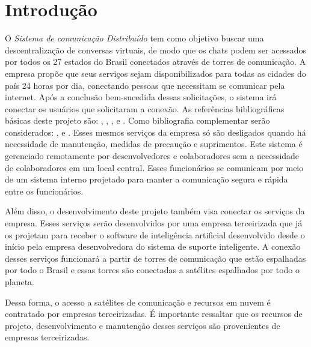 

\chapter{ Introdu\c{c}\~{a}o}

O \textit{Sistema de comunicação Distribuído} tem como objetivo buscar uma descentralização de conversas virtuais, de modo que os chats podem ser acessados por todos os 27 estados do Brasil conectados através de torres de comunicação.
A empresa propõe que seus serviços sejam disponibilizados para todas as cidades do país 24 horas por dia, conectando pessoas que necessitam se comunicar pela internet. Após a conclusão bem-sucedida dessas solicitações, o sistema irá conectar os usuários que solicitaram a conexão.
 As refer\^{e}ncias bibliogr\'{a}ficas b\'{a}sicas deste projeto s\~{a}o: \cite{Dennis2014}, \cite{Engholm2013}, \cite{Guedes2011},  \cite{Sommerville2018} e \cite{Wazlawick2011}. Como bibliografia complementar ser\~{a}o considerados: \cite{Satzinger2012}, \cite{Shelly2012} e  \cite{Furgeri2013}.
Esses mesmos serviços da empresa só são desligados quando há necessidade de manutenção, medidas de precaução e suprimentos. Este sistema é gerenciado remotamente por desenvolvedores e colaboradores sem a necessidade de colaboradores em um local central. Esses funcionários se comunicam por meio de um sistema interno projetado para manter a comunicação segura e rápida entre os funcionários.

Além disso, o desenvolvimento deste projeto também visa conectar os serviços da empresa. Esses serviços serão desenvolvidos por uma empresa terceirizada que já os projetam para receber o software de inteligência artificial desenvolvido desde o início pela empresa desenvolvedora do sistema de suporte inteligente. A conexão desses serviços funcionará a partir de torres de comunicação que estão espalhadas por todo o Brasil e essas torres são conectadas a satélites espalhados por todo o planeta.

Dessa forma, o acesso a satélites de comunicação e recursos em nuvem é contratado por empresas terceirizadas.
É importante ressaltar que os recursos de projeto, desenvolvimento e manutenção desses serviços são provenientes de empresas terceirizadas.

